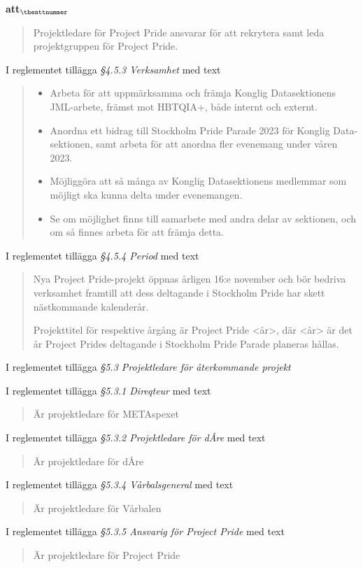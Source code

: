 \documentclass[a4paper]{article}
\begin{document}
\begin{list}{\bf att$_{\theattnummer}$}{}
\begin{quote}
        Projektledare för Project Pride ansvarar för att rekrytera samt leda projektgruppen
        för Project Pride.
    \end{quote}
\item I reglementet tillägga \textit{\S4.5.3 Verksamhet} med text
    \begin{quote}
        \begin{itemize}
            \item Arbeta för att uppmärksamma och främja Konglig Datasektionens JML-arbete, främst mot HBTQIA+, både internt och externt.
            \item Anordna ett bidrag till Stockholm Pride Parade 2023 för Konglig Data-sektionen, samt arbeta för att anordna fler evenemang under våren 2023.
            \item Möjliggöra att så många av Konglig Datasektionens medlemmar som möjligt ska kunna delta under evenemangen.
            \item Se om möjlighet finns till samarbete med andra delar av sektionen, och om så finnes arbeta för att främja detta.
        \end{itemize}
    \end{quote}
\item I reglementet tillägga \textit{\S4.5.4 Period} med text
    \begin{quote}
        Nya Project Pride-projekt öppnas årligen 16:e november och bör bedriva verksamhet framtill att dess deltagande i Stockholm Pride har skett nästkommande kalenderår.

        Projekttitel för respektive årgång är Project Pride <år>, där <år> är det år Project Prides deltagande i Stockholm Pride Parade planeras hållas.
    \end{quote}


\item I reglementet tillägga \textit{\S5.3 Projektledare för återkommande projekt}
\item I reglementet tillägga \textit{\S5.3.1 Direqteur} med text
    \begin{quote}
        Är projektledare för METAspexet
    \end{quote}
\item I reglementet tillägga \textit{\S5.3.2 Projektledare för dÅre} med text
    \begin{quote}
        Är projektledare för dÅre
    \end{quote}
\item I reglementet tillägga \textit{\S5.3.4 Vårbalsgeneral} med text
    \begin{quote}
        Är projektledare för Vårbalen
    \end{quote}
\item I reglementet tillägga \textit{\S5.3.5 Ansvarig för Project Pride} med text
    \begin{quote}
        Är projektledare för Project Pride
    \end{quote}


\end{list}
\end{document}
